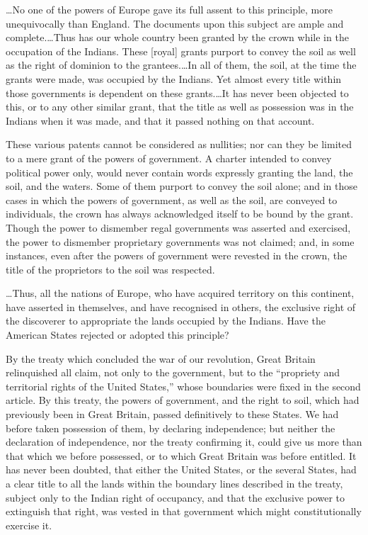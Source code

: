 \ldots No one of the powers of Europe gave its full assent to this principle,
more unequivocally than England. The documents upon this subject are ample and
complete.\ldots Thus has our whole country been granted by the crown while in
the occupation of the Indians. These [royal] grants purport to convey the soil
as well as the right of dominion to the grantees.\ldots In all of them, the
soil, at the time the grants were made, was occupied by the Indians. Yet almost
every title within those governments is dependent on these grants.\ldots It has
never been objected to this, or to any other similar grant, that the title as
well as possession was in the Indians when it was made, and that it passed
nothing on that account.

These various patents cannot be considered as nullities; nor can they be limited
to a mere grant of the powers of government. A charter intended to convey
political power only, would never contain words expressly granting the land, the
soil, and the waters. Some of them purport to convey the soil alone; and in
those cases in which the powers of government, as well as the soil, are conveyed
to individuals, the crown has always acknowledged itself to be bound by the
grant. Though the power to dismember regal governments was asserted and
exercised, the power to dismember proprietary governments was not claimed; and,
in some instances, even after the powers of government were revested in the
crown, the title of the proprietors to the soil was respected.

\ldots Thus, all the nations of Europe, who have acquired territory on this
continent, have asserted in themselves, and have recognised in others, the
exclusive right of the discoverer to appropriate the lands occupied by the
Indians. Have the American States rejected or adopted this principle?

By the treaty which concluded the war of our revolution, Great Britain
relinquished all claim, not only to the government, but to the ``propriety and
territorial rights of the United States,'' whose boundaries were fixed in the
second article. By this treaty, the powers of government, and the right to soil,
which had previously been in Great Britain, passed definitively to these States.
We had before taken possession of them, by declaring independence; but neither
the declaration of independence, nor the treaty confirming it, could give us
more than that which we before possessed, or to which Great Britain was before
entitled. It has never been doubted, that either the United States, or the
several States, had a clear title to all the lands within the boundary lines
described in the treaty, subject only to the Indian right of occupancy, and that
the exclusive power to extinguish that right, was vested in that government
which might constitutionally exercise it.

